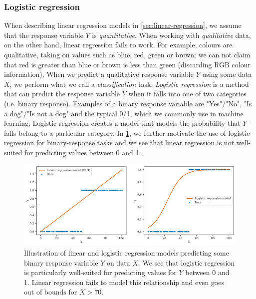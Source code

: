 \subsubsection{Logistic regression}
\label{sec:logistic-regression}
When describing linear regression models in \cref{sec:linear-regression}, we assume that the response variable $Y$ is \textit{quantitative}. When working with \textit{qualitative} data, on the other hand, linear regression fails to work. For example, colours are qualitative, taking on values such as blue, red, green or brown; we can not claim that red is greater than blue or brown is less than green (discarding RGB colour information). When we predict a qualitative response variable $Y$ using some data $X$, we perform what we call a \textit{classification} task. \textit{Logistic regression} is a method that can predict the response variable $Y$ when it falls into one of two categories (i.e. binary response). Examples of a binary response variable are "Yes"/"No", "Is a dog"/"Is not a dog" and the typical 0/1, which we commonly use in machine learning. Logistic regression creates a model that models the probability that $Y$ falls belong to a particular category. In \cref{fig:logistic-regression-example}, we further motivate the use of logistic regression for binary-response tasks and we see that linear regression is not well-suited for predicting values between 0 and 1.
\begin{figure}[H]
    \centering
    \includegraphics[width=\textwidth]{thesis/figures/logistic-regression-example.pdf}
    \caption{Illustration of linear and logistic regression models predicting some binary response variable $Y$ on data $X$. We see that logistic regression is particularly well-suited for predicting values for $Y$ between 0 and 1. Linear regression fails to model this relationship and even goes out of bounds for $X > 70$.}
    \label{fig:logistic-regression-example}
\end{figure}

